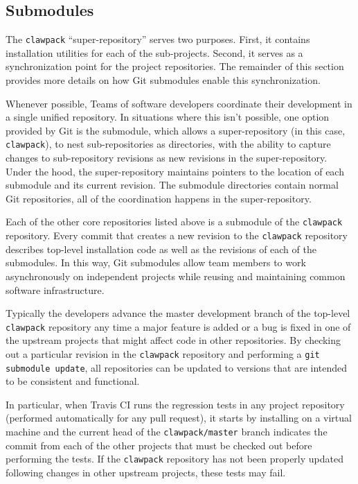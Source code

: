 \subsection{Submodules}

The \texttt{clawpack} ``super-repository'' serves two purposes. First, it contains
installation utilities for each of the sub-projects.
Second, it serves as a synchronization point for the project repositories. The remainder of
this section provides more details on how Git submodules enable this synchronization.

Whenever possible, Teams of software developers coordinate their development in a single 
unified repository. In situations where this isn't possible, one option provided by Git
is the submodule, which allows a super-repository (in this case, \texttt{clawpack}), to nest
sub-repositories as directories, with the ability to capture changes to sub-repository 
revisions as new revisions in the super-repository. Under the hood, the super-repository 
maintains pointers to the location of each submodule and its current revision. The submodule 
directories contain normal Git repositories, all of the coordination happens in the 
super-repository.

Each of the other core \clawpack repositories listed above is a submodule
of the \texttt{clawpack} repository.  Every commit that creates a new revision to 
the \texttt{clawpack} repository describes top-level installation code as well as 
the revisions of each of the submodules. In this way, Git submodules allow 
\clawpack team members to work asynchronously on independent projects while 
reusing and maintaining common software infrastructure.

Typically the \clawpack developers advance the master development
branch of the top-level \texttt{clawpack}
repository any time a major feature is added
or a bug is fixed in one of the upstream projects that might affect code in
other repositories.  By checking out a particular revision in the
\texttt{clawpack} repository and performing a \texttt{git submodule update},
all repositories can be updated to versions that are intended to be
consistent and functional.

In particular, when Travis CI runs the regression tests in any project
repository (performed automatically for any pull request), it starts
by installing \clawpack on a virtual machine and the current head
of the \texttt{clawpack/master} branch indicates the commit from each of the
other projects that must be checked out before performing the tests.
If the \texttt{clawpack} repository has not been properly updated
following changes in other upstream projects, these tests may fail.

